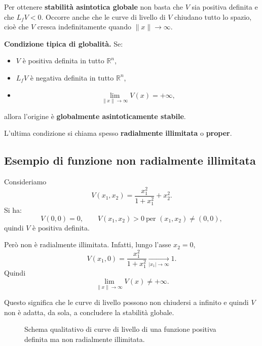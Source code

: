 Per ottenere \textbf{stabilità asintotica globale} non basta che \(V\) sia positiva definita e che \(L_fV<0\).  
Occorre anche che le curve di livello di \(V\) chiudano tutto lo spazio, cioè che \(V\) cresca indefinitamente quando \(\|x\|\to\infty\).

\medskip

\noindent
\textbf{Condizione tipica di globalità.}
Se:
\begin{itemize}
    \item \(V\) è positiva definita in tutto \(\mathbb{R}^n\),
    \item \(L_fV\) è negativa definita in tutto \(\mathbb{R}^n\),
    \item
    \[
    \lim_{\|x\|\to\infty} V(x)=+\infty,
    \]
\end{itemize}
allora l'origine è \textbf{globalmente asintoticamente stabile}.

L'ultima condizione si chiama spesso \textbf{radialmente illimitata} o \textbf{proper}.

\subsection{Esempio di funzione non radialmente illimitata}

Consideriamo
\[
V(x_1,x_2)=\frac{x_1^2}{1+x_1^2}+x_2^2.
\]
Si ha:
\[
V(0,0)=0,
\qquad
V(x_1,x_2)>0 \ \text{per } (x_1,x_2)\neq (0,0),
\]
quindi \(V\) è positiva definita.

Però non è radialmente illimitata. Infatti, lungo l'asse \(x_2=0\),
\[
V(x_1,0)=\frac{x_1^2}{1+x_1^2}\xrightarrow[|x_1|\to\infty]{}1.
\]
Quindi
\[
\lim_{\|x\|\to\infty}V(x)\neq +\infty.
\]

Questo significa che le curve di livello possono non chiudersi a infinito e quindi \(V\) non è adatta, da sola, a concludere la stabilità globale.

\begin{figure}[h!]
\centering
{}
\caption{Schema qualitativo di curve di livello di una funzione positiva definita ma non radialmente illimitata.}
\end{figure}

